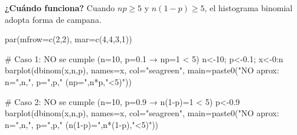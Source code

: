 \documentclass[
  letterpaper,
  DIV=11,
  numbers=noendperiod]{scrartcl}
\newenvironment{Shaded}{\begin{snugshade}}{\end{snugshade}}
\newcommand{\AttributeTok}[1]{\textcolor[rgb]{0.40,0.45,0.13}{#1}}
\newcommand{\CommentTok}[1]{\textcolor[rgb]{0.37,0.37,0.37}{#1}}
\newcommand{\DecValTok}[1]{\textcolor[rgb]{0.68,0.00,0.00}{#1}}
\newcommand{\FloatTok}[1]{\textcolor[rgb]{0.68,0.00,0.00}{#1}}
\newcommand{\FunctionTok}[1]{\textcolor[rgb]{0.28,0.35,0.67}{#1}}
\newcommand{\NormalTok}[1]{\textcolor[rgb]{0.00,0.23,0.31}{#1}}
\newcommand{\OtherTok}[1]{\textcolor[rgb]{0.00,0.23,0.31}{#1}}
\newcommand{\SpecialCharTok}[1]{\textcolor[rgb]{0.37,0.37,0.37}{#1}}
\newcommand{\StringTok}[1]{\textcolor[rgb]{0.13,0.47,0.30}{#1}}
\begin{document}
\textbf{¿Cuándo funciona?} Cuando \(np \geq 5\) y \(n(1-p) \geq 5\), el
histograma binomial adopta forma de campana.

\begin{Shaded}
\begin{Highlighting}[]
\FunctionTok{par}\NormalTok{(}\AttributeTok{mfrow=}\FunctionTok{c}\NormalTok{(}\DecValTok{2}\NormalTok{,}\DecValTok{2}\NormalTok{), }\AttributeTok{mar=}\FunctionTok{c}\NormalTok{(}\DecValTok{4}\NormalTok{,}\DecValTok{4}\NormalTok{,}\DecValTok{3}\NormalTok{,}\DecValTok{1}\NormalTok{))}

\CommentTok{\# Caso 1: NO se cumple (n=10, p=0.1 → np=1 \textless{} 5)}
\NormalTok{n}\OtherTok{\textless{}{-}}\DecValTok{10}\NormalTok{; p}\OtherTok{\textless{}{-}}\FloatTok{0.1}\NormalTok{; x}\OtherTok{\textless{}{-}}\DecValTok{0}\SpecialCharTok{:}\NormalTok{n}
\FunctionTok{barplot}\NormalTok{(}\FunctionTok{dbinom}\NormalTok{(x,n,p), }\AttributeTok{names=}\NormalTok{x, }\AttributeTok{col=}\StringTok{"seagreen"}\NormalTok{, }\AttributeTok{main=}\FunctionTok{paste0}\NormalTok{(}\StringTok{"NO aprox: n="}\NormalTok{,n,}\StringTok{", p="}\NormalTok{,p,}\StringTok{" (np="}\NormalTok{,n}\SpecialCharTok{*}\NormalTok{p,}\StringTok{"\textless{}5)"}\NormalTok{))}

\CommentTok{\# Caso 2: NO se cumple (n=10, p=0.9 → n(1{-}p)=1 \textless{} 5)}
\NormalTok{p}\OtherTok{\textless{}{-}}\FloatTok{0.9}
\FunctionTok{barplot}\NormalTok{(}\FunctionTok{dbinom}\NormalTok{(x,n,p), }\AttributeTok{names=}\NormalTok{x, }\AttributeTok{col=}\StringTok{"seagreen"}\NormalTok{, }\AttributeTok{main=}\FunctionTok{paste0}\NormalTok{(}\StringTok{"NO aprox: n="}\NormalTok{,n,}\StringTok{", p="}\NormalTok{,p,}\StringTok{" (n(1{-}p)="}\NormalTok{,n}\SpecialCharTok{*}\NormalTok{(}\DecValTok{1}\SpecialCharTok{{-}}\NormalTok{p),}\StringTok{"\textless{}5)"}\NormalTok{))}


\end{Highlighting}
\end{Shaded}
\end{document}
